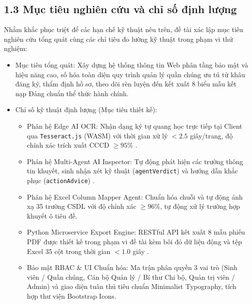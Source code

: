 \documentclass[12pt,a4paper]{report}
\begin{document}
\subsection*{1.3 Mục tiêu nghiên cứu và chỉ số định lượng}
Nhằm khắc phục triệt để các hạn chế kỹ thuật nêu trên, đề tài xác lập mục tiêu nghiên cứu tổng quát cùng các chỉ tiêu đo lường kỹ thuật trong phạm vi thử nghiệm:
\begin{itemize}[label=--,leftmargin=*]
  \item Mục tiêu tổng quát: Xây dựng hệ thống thông tin Web phân tầng bảo mật và hiệu năng cao, số hóa toàn diện quy trình quản lý quần chúng ưu tú từ khâu đăng ký, thẩm định hồ sơ, theo dõi rèn luyện đến kết xuất 8 biểu mẫu kết nạp Đảng chuẩn thể thức hành chính.
  \item Chỉ số kỹ thuật định lượng (Mục tiêu thiết kế):
        \begin{itemize}[label=--,leftmargin=*]
          \item Phân hệ Edge AI OCR: Nhận dạng ký tự quang học trực tiếp tại Client qua \texttt{Tesseract.js} (WASM) với thời gian xử lý $< 2.5$ giây/trang, độ chính xác trích xuất CCCD $\ge 95$\% \cite{singh2023edgeai, passarotto2024edge}.
          \item Phân hệ Multi-Agent AI Inspector: Tự động phát hiện các trường thông tin khuyết, sinh nhận xét kỹ thuật (\texttt{agentVerdict}) và hướng dẫn khắc phục (\texttt{actionAdvice}) \cite{wang2024survey, zhang2025llm}.
          \item Phân hệ Excel Column Mapper Agent: Chuẩn hóa chuỗi và tự động ánh xạ 35 trường CSDL với độ chính xác $\ge 96$\%, tự động xử lý trường hợp khuyết ô tiêu đề.
          \item Python Microservice Export Engine: RESTful API kết xuất 8 mẫu phiếu PDF được thiết kế trong phạm vi đề tài kèm bôi đỏ dữ liệu động và tệp Excel 35 cột trong thời gian $< 1.0$ giây \cite{kartinah2022eajmr, mojsilovic2024tie}.
          \item Bảo mật RBAC \& UI Chuẩn hóa: Ma trận phân quyền 3 vai trò (Sinh viên / Quần chúng, Cán bộ Quản lý / Bí thư Chi bộ, Quản trị viên / Admin) và giao diện tuân thủ tiêu chuẩn Minimalist Typography, tích hợp thư viện Bootstrap Icons.
        \end{itemize}
\end{itemize}
\end{document}
